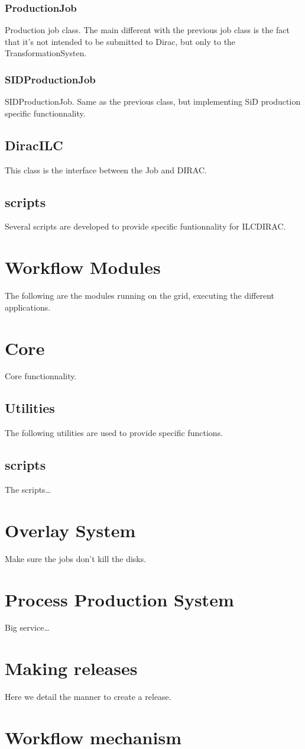 \documentclass[a4paper,12pt]{article}
\begin{document}
\subsubsection{ProductionJob}\label{prodjob}
Production job class. The main different with the previous job class is the fact
that it's not intended to be submitted to Dirac, but only to the
TransformationSysten.

\subsubsection{SIDProductionJob}\label{sidprod}
SIDProductionJob. Same as the previous class, but implementing SiD production
specific functionnality.

\subsection{DiracILC}\label{diracilc}
This class is the interface between the Job and DIRAC.

\subsection{scripts}\label{interfacescripts}
Several scripts are developed to provide specific funtionnality for ILCDIRAC.

\section{Workflow Modules}\label{modules}
The following are the modules running on the grid, executing the different
applications.

\section{Core}\label{core}
Core functionnality.
\subsection{Utilities}\label{coreutilities}
The following utilities are used to provide specific functions.
\subsection{scripts}\label{corescripts}
The scripts\ldots

\section{Overlay System}\label{overlaysys}
Make sure the jobs don't kill the disks.

\section{Process Production System}\label{processprodsys}
Big service\ldots

\section{Making releases}\label{makingrelease}
Here we detail the manner to create a release.

\section{Workflow mechanism}\label{workflowsys}
\end{document}

